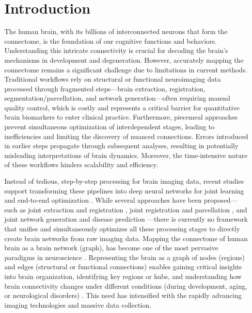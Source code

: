 \vspace{-5pt}
\section{Introduction}
\label{sec:intro}

The human brain, with its billions of interconnected neurons that form the connectome, is the foundation of our cognitive functions and behaviors. Understanding this intricate connectivity is crucial for decoding the brain's mechanisms in development and degeneration. However, accurately mapping the connectome remains a significant challenge due to limitations in current methods. Traditional workflows rely on structural or functional neuroimaging data processed through fragmented steps—brain extraction, registration, segmentation/parcellation, and network generation—often requiring manual quality control, which is costly and represents a critical barrier for quantitative brain biomarkers to enter clinical practice. Furthermore, piecemeal approaches prevent simultaneous optimization of interdependent stages, leading to inefficiencies and limiting the discovery of nuanced connections. Errors introduced in earlier steps propagate through subsequent analyses, resulting in potentially misleading interpretations of brain dynamics. Moreover, the time-intensive nature of these workflows hinders scalability and efficiency. 

Instead of tedious, step-by-step processing for brain imaging data, recent studies support transforming these pipelines into deep neural networks for joint learning and end-to-end optimization \cite{ren2024deepprep, agarwal2022end}. While several approaches have been proposed—such as joint extraction and registration \cite{su2022ernet}, joint registration and parcellation \cite{zhao2021deep, lord2007simultaneous}, and joint network generation and disease prediction \cite{campbell2022dbgsl, mahmood2021deep, kan2022fbnetgen}—there is currently no framework that unifies and simultaneously optimizes all these processing stages to directly create brain networks from raw imaging data. Mapping the connectome of human brain as a brain network (\ie graph), has become one of the most pervasive paradigms in neuroscience \cite{sporns2005human,bargmann2013connectome}. Representing the brain as a graph of nodes (regions) and edges (structural or functional connections) enables gaining critical insights into brain organization, identifying key regions or hubs, and understanding how brain connectivity changes under different conditions (\eg during development, aging, or neurological disorders) \cite{kaiser2011tutorial,crossley2014hubs,xu2015connectome}. This need has intensified with the rapidly advancing imaging technologies and massive data collection.

